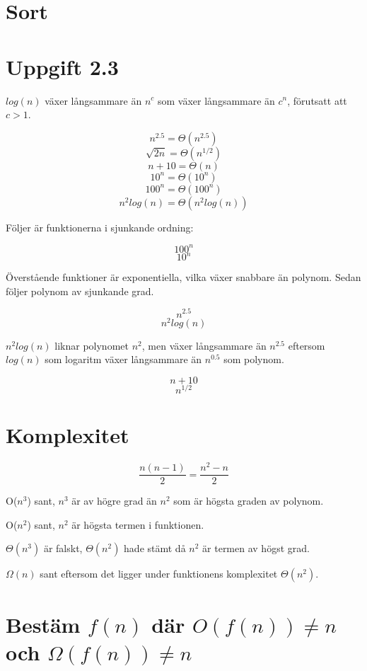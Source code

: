\documentclass{article}
\begin{document}
\section*{Sort}



\section*{Uppgift 2.3}

	$log(n)$ växer långsammare än $n^{c}$ som växer långsammare än $c^{n}$, förutsatt att $c>1$.

	\[n^{2.5} = \Theta(n^{2.5})\]
	\[\sqrt{2n} = \Theta(n^{1/2})\]
	\[n + 10 = \Theta(n)\]
	\[10^{n} = \Theta(10^{n})\]
	\[100^{n} = \Theta(100^{n})\]
	\[n^{2}log(n) = \Theta(n^{2}log(n))\]

	Följer är funktionerna i sjunkande ordning:

	\[100^{n}\]
	\[10^{n}\]
	
	Överstående funktioner är exponentiella, vilka växer snabbare än polynom. Sedan följer polynom av sjunkande grad.

	\[n^{2.5}\]
	\[n^{2}log(n)\]

	$n^{2}log(n)$ liknar polynomet $n^{2}$, men växer långsammare än $n^{2.5}$ eftersom $log(n)$ som logaritm växer långsammare än $n^{0.5}$ som polynom.

	\[n+10\]
	\[n^{1/2}\]

\section*{Komplexitet}

	\[\frac{n(n-1)}{2} = \frac{n^{2}-n}{2}\]

	O($n^{3}$) sant, $n^{3}$ är av högre grad än $n^{2}$ som är högsta graden av polynom.

	O($n^{2}$) sant, $n^{2}$ är högsta termen i funktionen.

	$\Theta(n^{3})$ är falskt, $\Theta(n^{2})$ hade stämt då $n^{2}$ är termen av högst grad.

	$\Omega(n)$ sant eftersom det ligger under funktionens komplexitet $\Theta(n^{2})$.\newline

\section*{Bestäm $f(n)$ där $O(f(n)) \neq n$ och $\Omega(f(n)) \neq n$}
\end{document}
